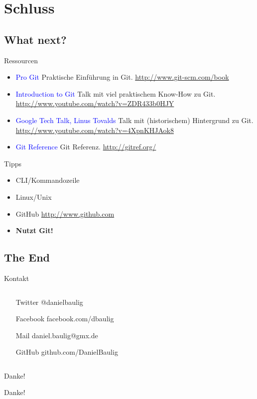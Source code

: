 \section{Schluss}
\subsection{What next?}

\begin{frame}{Ressourcen}
    \begin{itemize}[<+->]
        \item \textcolor{blue}{Pro Git} Praktische Einführung in Git. \url{http://www.git-scm.com/book}
        \item \textcolor{blue}{Introduction to Git} Talk mit viel praktischem Know-How zu Git. \url{http://www.youtube.com/watch?v=ZDR433b0HJY}
        \item \textcolor{blue}{Google Tech Talk, Linus Tovalds} Talk mit (historischem) Hintergrund zu Git. \url{http://www.youtube.com/watch?v=4XpnKHJAok8}
        \item \textcolor{blue}{Git Reference} Git Referenz. \url{http://gitref.org/}
    \end{itemize}
\end{frame}

\begin{frame}{Tipps}
    \begin{itemize}[<+->]
        \item CLI/Kommandozeile
        \item Linux/Unix
        \item GitHub \url{http://www.github.com}
        \item \textbf{Nutzt Git!}
    \end{itemize}
\end{frame}

\subsection{The End}

\begin{frame}{Kontakt}
    \begin{columns}
        \begin{column}{.8\textwidth}
            \begin{itemize}
                \item [Twitter] @danielbaulig
                \item [Facebook] facebook.com/dbaulig
                \item [Mail] daniel.baulig@gmx.de
                \item [GitHub] github.com/DanielBaulig
            \end{itemize}
        \end{column}
    \end{columns}
\end{frame}

\begin{frame}{Danke!}
    \centerline{\Huge{Danke!}}
\end{frame}


